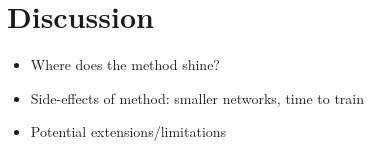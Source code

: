 \section{Discussion}

\begin{itemize}
  \item Where does the method shine?
  \item Side-effects of method: smaller networks, time to train
  \item Potential extensions/limitations
\end{itemize}